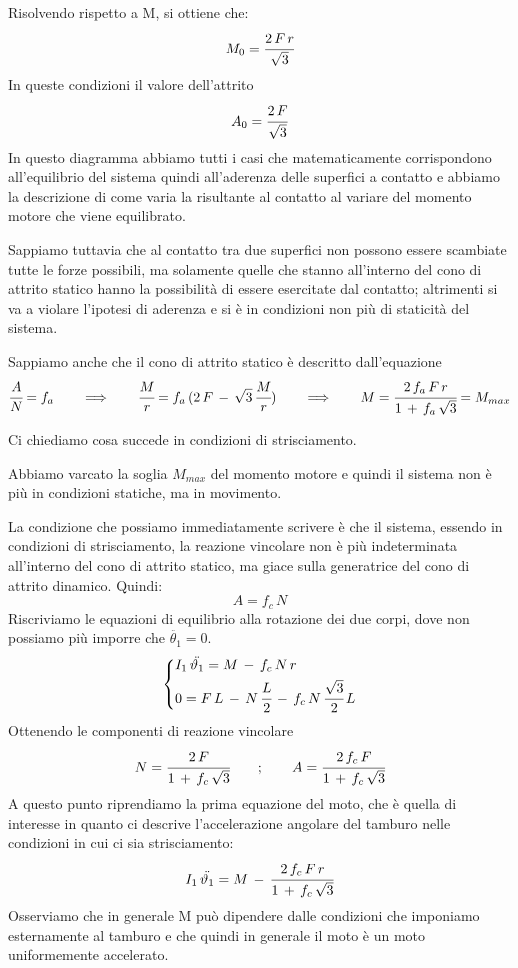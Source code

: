 Risolvendo rispetto a M, si ottiene che:
\[M_0 = \cfrac{2\,F\,r}{\sqrt{3}}\]
In queste condizioni il valore dell'attrito
\[A_0 = \cfrac{2\,F}{\sqrt{3}}\]
In questo diagramma abbiamo tutti i casi che matematicamente corrispondono all'equilibrio del sistema quindi all'aderenza delle superfici a contatto e abbiamo la descrizione di come varia la risultante al contatto al variare del momento motore che viene equilibrato.

Sappiamo tuttavia che al contatto tra due superfici non possono essere scambiate tutte le forze possibili, ma solamente quelle che stanno all'interno del cono di attrito statico hanno la possibilità di essere esercitate dal contatto; altrimenti si va a violare l'ipotesi di aderenza e si è in condizioni non più di staticità del sistema.

Sappiamo anche che il cono di attrito statico è descritto dall'equazione
\[\cfrac{A}{N} = f_a\qquad\Longrightarrow\qquad\cfrac{M}{r} = f_a\,(2\,F\,-\,\sqrt{3}\,\cfrac{M}{r})\qquad\Longrightarrow\qquad M = \cfrac{2\,f_a\,F\,r}{1\,+\,f_a\,\sqrt{3}} = M_{max}\]

Ci chiediamo cosa succede in condizioni di strisciamento.

Abbiamo varcato la soglia $M_{max}$ del momento motore e quindi il sistema non è più in condizioni statiche, ma in movimento.

La condizione che possiamo immediatamente scrivere è che il sistema, essendo in condizioni di strisciamento, la reazione vincolare non è più indeterminata all'interno del cono di attrito statico, ma giace sulla generatrice del cono di attrito dinamico. Quindi:
\[A = f_c\,N\]
Riscriviamo le equazioni di equilibrio alla rotazione dei due corpi, dove non possiamo più imporre che $\ddot{\theta_1} = 0$.
\[
\begin{dcases}
I_1\,\ddot{\theta_1} = M\,-\,f_c\,N\,r\\
0 = F\,L\,-\,N\,\cfrac{L}{2}\,-\,f_c\,N\,\cfrac{\sqrt{3}}{2}\,L
\end{dcases}
\]
Ottenendo le componenti di reazione vincolare
\[N = \cfrac{2\,F}{1\,+\,f_c\,\sqrt{3}}\qquad;\qquad A = \cfrac{2\,f_c\,F}{1\,+\,f_c\,\sqrt{3}}\]
A questo punto riprendiamo la prima equazione del moto, che è quella di interesse in quanto ci descrive l'accelerazione angolare del tamburo nelle condizioni in cui ci sia strisciamento:
\[I_1\,\ddot{\theta_1} = M\,-\,\cfrac{2\,f_c\,F\,r}{1\,+\,f_c\,\sqrt{3}}\]
Osserviamo che in generale M può dipendere dalle condizioni che imponiamo esternamente al tamburo e che quindi in generale il moto è un moto uniformemente accelerato.

